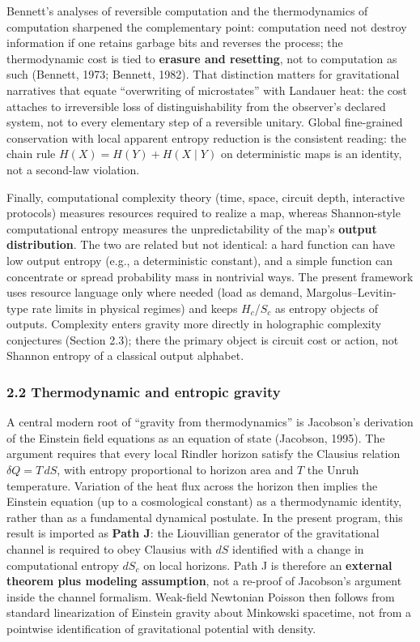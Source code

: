 \documentclass[
  11pt,
]{article}
\begin{document}
Bennett's analyses of reversible computation and the thermodynamics of computation sharpened the complementary point: computation need not destroy information if one retains garbage bits and reverses the process; the thermodynamic cost is tied to \textbf{erasure and resetting}, not to computation as such (Bennett, 1973; Bennett, 1982). That distinction matters for gravitational narratives that equate ``overwriting of microstates'' with Landauer heat: the cost attaches to irreversible loss of distinguishability from the observer's declared system, not to every elementary step of a reversible unitary. Global fine-grained conservation with local apparent entropy reduction is the consistent reading: the chain rule \(H(X)=H(Y)+H(X\mid Y)\) on deterministic maps is an identity, not a second-law violation.

Finally, computational complexity theory (time, space, circuit depth, interactive protocols) measures resources required to realize a map, whereas Shannon-style computational entropy measures the unpredictability of the map's \textbf{output distribution}. The two are related but not identical: a hard function can have low output entropy (e.g., a deterministic constant), and a simple function can concentrate or spread probability mass in nontrivial ways. The present framework uses resource language only where needed (load as demand, Margolus--Levitin-type rate limits in physical regimes) and keeps \(H_c\)/\(S_c\) as entropy objects of outputs. Complexity enters gravity more directly in holographic complexity conjectures (Section 2.3); there the primary object is circuit cost or action, not Shannon entropy of a classical output alphabet.

\subsubsection{2.2 Thermodynamic and entropic gravity}\label{thermodynamic-and-entropic-gravity}

A central modern root of ``gravity from thermodynamics'' is Jacobson's derivation of the Einstein field equations as an equation of state (Jacobson, 1995). The argument requires that every local Rindler horizon satisfy the Clausius relation \(\delta Q = T\,dS\), with entropy proportional to horizon area and \(T\) the Unruh temperature. Variation of the heat flux across the horizon then implies the Einstein equation (up to a cosmological constant) as a thermodynamic identity, rather than as a fundamental dynamical postulate. In the present program, this result is imported as \textbf{Path J}: the Liouvillian generator of the gravitational channel is required to obey Clausius with \(dS\) identified with a change in computational entropy \(dS_c\) on local horizons. Path J is therefore an \textbf{external theorem plus modeling assumption}, not a re-proof of Jacobson's argument inside the channel formalism. Weak-field Newtonian Poisson then follows from standard linearization of Einstein gravity about Minkowski spacetime, not from a pointwise identification of gravitational potential with density.
\end{document}
